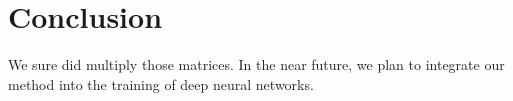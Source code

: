 \documentclass{article}  %
\begin{document}
\section{Conclusion}

We sure did multiply those matrices. In the near future, we plan to integrate our method into the training of deep neural networks.




% 
% 
% 

% 

% 
\end{document}
